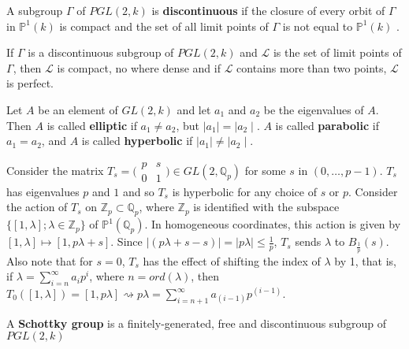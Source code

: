 \begin{definition*} \cite{gvdp} A subgroup $\Gamma$ of $PGL(2,k)$ is \textbf{discontinuous} if the closure of every orbit of $\Gamma$ in $\mathbb{P}^1(k)$ is compact and the set of all limit points of $\Gamma$ is not equal to  $\mathbb{P}^1(k)$ .
\end{definition*}

\begin{proposition*} \cite{gvdp} If $\Gamma$ is a discontinuous subgroup of $PGL(2,k)$  and $\mathcal{L}$ is the set of limit points of $\Gamma$, then $\mathcal{L}$ is compact, no where dense and if $\mathcal{L}$ contains more than two points, $\mathcal{L}$ is perfect.
\end{proposition*}

\begin{definition*} \cite{gvdp}
	Let $A$ be an element of $GL(2,k)$ and let $a_1$ and $a_2$  be the eigenvalues of $A$. Then $A$ is called \textbf{elliptic} if $a_1 \neq a_2$, but $\mid a_1\mid = \mid a_2\mid$. $A$ is called \textbf{parabolic} if $a_1 = a_2$, and $A$ is called \textbf{hyperbolic} if  $\mid a_1\mid \neq \mid a_2\mid$.
\end{definition*}

\begin{example} 
	Consider the matrix $T_s =  \bigl( \begin{smallmatrix}p & s\\ 0 & 1 \end{smallmatrix}\bigr) \in GL(2, \mathbb{Q}_p)$ for some $s$ in $(0,\ldots, p-1)$. $T_s$ has eigenvalues $p$ and $1$ and so $T_s$ is hyperbolic for any choice of $s$ or $p$. Consider the action of $T_s$ on $\mathbb{Z}_p \subset \mathbb{Q}_p$, where $\mathbb{Z}_p$ is identified with the subspace $\{[1,\lambda];\lambda \in \mathbb{Z}_p \}$ of $\mathbb{P}^1(\mathbb{Q}_p)$. In homogeneous coordinates, this action is given by $[1,\lambda] \mapsto [1, p\lambda +s]$. Since $\mid (p\lambda +s -s)\mid = \mid p\lambda\mid \leq \frac{1}{p}$, $T_s$ sends $\lambda$ to $B_\frac{1}{p}(s)$. Also note that for $s = 0$, $T_s$ has the effect of shifting the index of $\lambda$ by 1, that is, if $\lambda = \sum_{i=n}^\infty a_ip^i$, where $n = ord(\lambda)$, then $T_0([1,\lambda]) = [1, p\lambda] \rightsquigarrow p\lambda = \sum_{i=n+1}^\infty a_{(i-1)}p^{(i-1)}$.	
\end{example}	

\begin{definition*} \cite{gvdp} A \textbf{Schottky group} is a finitely-generated, free and discontinuous subgroup of  $PGL(2,k)$
\end{definition*}




